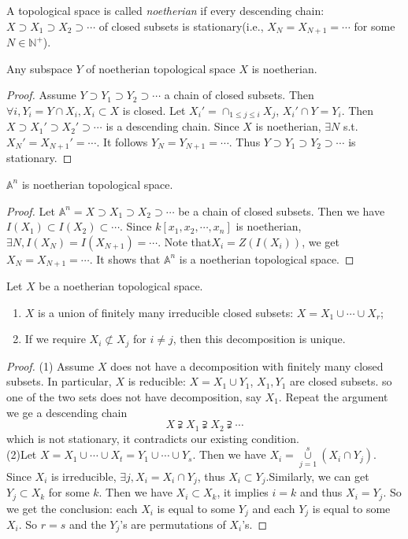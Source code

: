 \begin{definition}
	A topological space is called  \textit{noetherian} if every descending chain:$ X\supset X_1\supset X_2\supset \cdots $ of closed subsets is stationary(i.e., $ X_N=X_{N+1}=\cdots $ for some $ N\in \mathbb{N}^+ $).
\end{definition}
\begin{proposition}
	Any subspace $ Y $ of noetherian topological space $ X $ is noetherian.
\end{proposition}
\begin{proof}
	Assume $ Y\supset Y_1\supset Y_2\supset \cdots $ a chain of closed subsets.
	Then $ \forall i, Y_i=Y\cap X_i, X_i\subset X $ is closed.
	Let $ X_{i}' = \cap_{1\leq j \leq i} X_j $, $ X_i'\cap Y = Y_i $. Then $ X\supset X_1'\supset X_2'\supset \cdots $ is a descending chain. Since $ X $ is noetherian, $ \exists N $ s.t. $ X_N'=X_{N+1}'=\cdots $. It follows $ Y_N=Y_{N+1}=\cdots $. Thus $ Y\supset Y_1\supset Y_2\supset \cdots $ is stationary.
\end{proof}
\begin{proposition}
	$ \mathbb{A}^n $ is noetherian topological space.
\end{proposition}
\begin{proof}
	Let $ \mathbb{A}^n=X\supset X_1\supset X_2\supset \cdots $ be a chain of closed subsets. Then we have $ I(X_1)\subset I(X_2)\subset \cdots $. Since $ k[x_1,x_2,\cdots,x_n] $ is noetherian, $ \exists N, I(X_N)=I(X_{N+1})=\cdots $. Note that$ X_i=Z(I(X_i)) $, we get $ X_N=X_{N+1}=\cdots $. It shows that $ \mathbb{A}^n $ is a noetherian topological space.
\end{proof}
\begin{theorem}
	Let $ X $ be a noetherian topological space.
	\begin{enumerate}
		\item $ X $ is a union of finitely many irreducible closed subsets: $X=X_1\cup\cdots\cup X_r  $;
		\item If we require $ X_i\not\subset X_j  $ for $ i\neq j $, then this decomposition is unique.
	\end{enumerate}
\end{theorem}
\begin{proof}
	(1) Assume $ X $ does not have a decomposition with finitely many closed subsets. In particular, $ X $ is reducible: $ X=X_1\cup Y_1 $, $ X_1,Y_1 $ are closed subsets. so one of the two sets does not have decomposition, say $ X_1 $. Repeat the argument we ge a descending chain
	$$
		X\supsetneqq X_1\supsetneqq X_2\supsetneqq \cdots
	$$
	which is not stationary, it contradicts our existing condition.\\
	(2)Let $ X=X_1\cup \cdots\cup X_t = Y_1\cup\cdots\cup Y_s$. Then we have $ X_i = \mathop{\cup}\limits_{j=1}^{s}(X_i\cap Y_j)$. Since $ X_i $ is irreducible, $ \exists j, X_i=X_i\cap Y_j $, thus $ X_i\subset Y_j $.Similarly, we can get $ Y_j\subset X_k $ for some $ k $. Then we have $ X_i\subset X_k $, it implies $ i=k $ and thus $ X_i = Y_j $. So we get the conclusion: each $ X_i $ is equal to some $ Y_j $ and each $ Y_j $ is equal to some $ X_i $. So $ r=s $ and the $ Y_j $'s are permutations of $ X_i $'s.
\end{proof}
